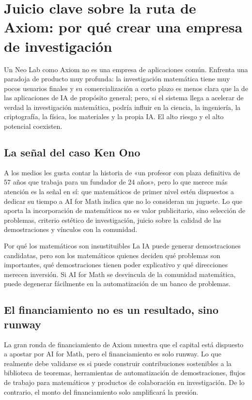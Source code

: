 \section{Juicio clave sobre la ruta de Axiom: por qué crear una empresa de investigación}

Un Neo Lab como Axiom no es una empresa de aplicaciones común. Enfrenta una paradoja de producto muy profunda: la investigación matemática tiene muy pocos usuarios finales y su comercialización a corto plazo es menos clara que la de las aplicaciones de IA de propósito general; pero, si el sistema llega a acelerar de verdad la investigación matemática, podría influir en la ciencia, la ingeniería, la criptografía, la física, los materiales y la propia IA. El alto riesgo y el alto potencial coexisten.

\subsection{La señal del caso Ken Ono}

A los medios les gusta contar la historia de «un profesor con plaza definitiva de 57 años que trabaja para un fundador de 24 años», pero lo que merece más atención es la señal en sí: que matemáticos de primer nivel estén dispuestos a dedicar su tiempo a AI for Math indica que no lo consideran un juguete. Lo que aporta la incorporación de matemáticos no es valor publicitario, sino selección de problemas, criterio estético de investigación, juicio sobre la calidad de las demostraciones y vínculos con la comunidad.

\begin{importantbox}{Por qué los matemáticos son insustituibles}
La IA puede generar demostraciones candidatas, pero son los matemáticos quienes deciden qué problemas son importantes, qué demostraciones tienen poder explicativo y qué direcciones merecen inversión. Si AI for Math se desvincula de la comunidad matemática, puede degenerar fácilmente en la automatización de un banco de problemas.
\end{importantbox}

\subsection{El financiamiento no es un resultado, sino runway}

La gran ronda de financiamiento de Axiom muestra que el capital está dispuesto a apostar por AI for Math, pero el financiamiento es solo runway. Lo que realmente debe validarse es si puede construir contribuciones sostenibles a la biblioteca de teoremas, herramientas de automatización de demostraciones, flujos de trabajo para matemáticos y productos de colaboración en investigación. De lo contrario, el monto del financiamiento solo amplificará la presión.

